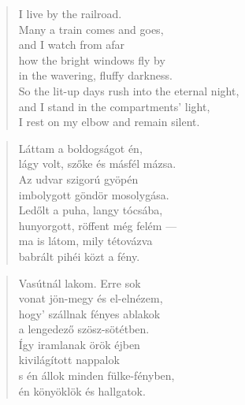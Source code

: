 \begin{verse}
  I live by the railroad. \\
  Many a train comes and goes, \\
  and I watch from afar \\
  how the bright windows fly by \\
  in the wavering, fluffy darkness. \\
  So the lit-up days rush into the eternal night, \\
  and I stand in the compartments' light, \\
  I rest on my elbow and remain silent.
\end{verse}

\newpage

\vspace*{-15mm}
\centeredornament



\begin{verse}
  Láttam a boldogságot én, \\
  lágy volt, szőke és másfél mázsa. \\
  Az udvar szigorú gyöpén \\
  imbolygott göndör mosolygása. \\
  Ledőlt a puha, langy tócsába, \\
  hunyorgott, röffent még felém --- \\
  ma is látom, mily tétovázva \\
  babrált pihéi közt a fény.
\end{verse}

\bigskip


\begin{verse}
  Vasútnál lakom. Erre sok \\
  vonat jön-megy és el-elnézem, \\
  hogy' szállnak fényes ablakok \\
  a lengedező szösz-sötétben. \\
  Így iramlanak örök éjben \\
  kivilágított nappalok \\
  s én állok minden fülke-fényben, \\
  én könyöklök és hallgatok.
\end{verse}
